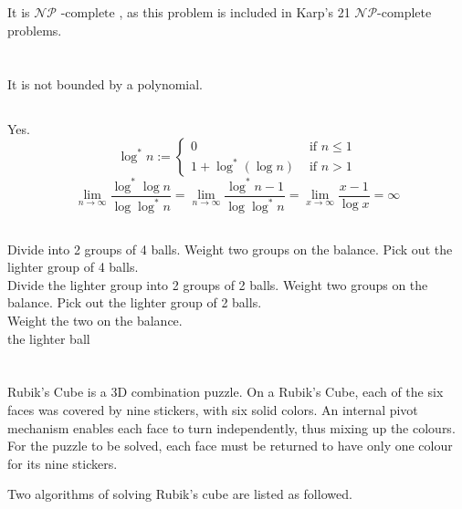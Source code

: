 \documentclass[12pt,a4paper]{article}
\theoremstyle{definition}
\begin{document}
\subsection{}
    It is $\mathcal{N} \mathcal{P} \text { -complete }$, as this problem is included in Karp's 21 $\mathcal{NP}$-complete problems.

\section{}
\subsection{}
    It is not bounded by a polynomial.
\subsection{}
Yes.
$$
\log ^{*} n:=\left\{\begin{array}{ll}{0} & {\text { if } n \leq 1} \\ {1+\log ^{*}(\log n)} & {\text { if } n>1}\end{array}\right.
$$
$$
\lim _{n \rightarrow \infty} \frac{\log ^{*} \log n}{\log \log ^{*} n} = \lim _{n \rightarrow \infty} \frac{\log ^{*} n-1}{\log \log ^{*} n} =\lim _{x \rightarrow \infty}\frac{x-1}{\log x} = \infty
$$
\subsection{}
\begin{algorithm}[H]
    Divide into 2 groups of 4 balls. Weight two groups on the balance. Pick out the lighter group of 4 balls. \\
    Divide the lighter group into 2 groups of 2 balls. Weight two groups on the balance. Pick out the lighter group of 2 balls. \\
    Weight the two on the balance. \\
    \Return the lighter ball
\end{algorithm}
\section{}
\par Rubik's Cube is a 3D combination puzzle. On a Rubik's Cube, each of the six faces was covered by nine stickers, with six solid colors. An internal pivot mechanism enables each face to turn independently, thus mixing up the colours. For the puzzle to be solved, each face must be returned to have only one colour for its nine stickers.
\par Two algorithms of solving Rubik's cube are listed as followed.
\newpage
\end{document}
